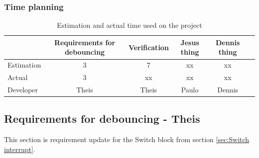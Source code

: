 \subsubsection{Time planning}

\begin{table}[H]
\centering
	\begin{tabular}{|l|c|c|c|c|c|}
		\hline
		~			& Requirements for debouncing	& Verification			& Jesus thing		& Dennis thing	\\ \hline
		Estimation	& 3								& 7						& xx				& xx			\\
		Actual		& 3 							& xx					& xx				& xx			\\
		Developer	& Theis							& Theis					& Paulo				& Dennis		\\
		\hline
	\end{tabular}
	\caption{Estimation and actual time used on the project}
\end{table}
\subsection{Requirements for debouncing - Theis}
%
This section is requirement update for the Switch block from section \ref{sec:Switch interrupt}.
